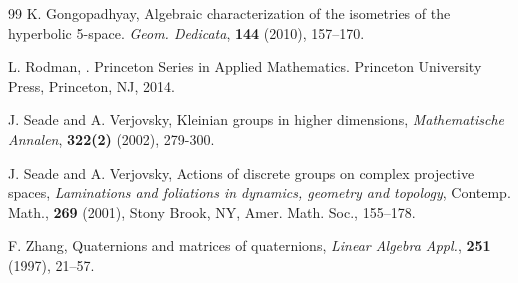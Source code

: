 \documentclass[12pt,reqno]{amsart}
\numberwithin{equation}{section}
\theoremstyle{definition}
\begin{document}
\begin{thebibliography}{99}
	    K. Gongopadhyay,  Algebraic characterization of the isometries of the hyperbolic 5-space. {\it Geom.  Dedicata}, {\bf 144} (2010), 157--170. 
    
			L. Rodman,
			.
			\newblock Princeton Series in Applied Mathematics. Princeton University Press,
			Princeton, NJ, 2014.
			
			 J. Seade and A. Verjovsky, Kleinian groups in higher dimensions, {\it Mathematische Annalen}, {\bf 322(2)} (2002), 279-300.
			
			 J. Seade and A. Verjovsky, { Actions of discrete groups on complex projective spaces}, {\em Laminations and foliations in dynamics, geometry and topology}, Contemp. Math., {\bf 269} (2001), Stony {B}rook, {NY}, Amer. Math. Soc., 155--178.
            
		 F. Zhang,  Quaternions and matrices of quaternions,  {\it Linear Algebra Appl.},  {\bf 251} (1997), 21--57.
		\end{thebibliography}
	
    
\end{document}

